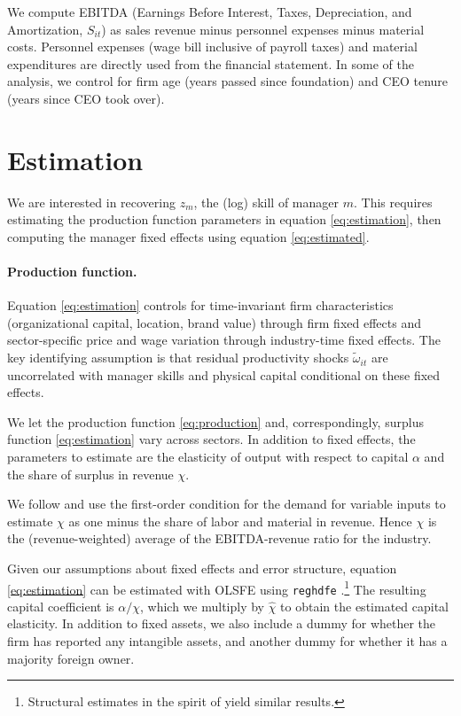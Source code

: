 \documentclass[11pt,a4paper]{article}
\begin{document}
We compute EBITDA (Earnings Before Interest, Taxes, Depreciation, and Amortization, $S_{it}$) as sales revenue minus personnel expenses minus material costs. Personnel expenses (wage bill inclusive of payroll taxes) and material expenditures are directly used from the financial statement. In some of the analysis, we control for firm age (years passed since foundation) and CEO tenure (years since CEO took over).

\section{Estimation}

We are interested in recovering $z_m$, the (log) skill of manager $m$. This requires estimating the production function parameters in equation \eqref{eq:estimation}, then computing the manager fixed effects using equation \eqref{eq:estimated}.

\paragraph{Production function.}
Equation \eqref{eq:estimation} controls for time-invariant firm characteristics (organizational capital, location, brand value) through firm fixed effects and sector-specific price and wage variation through industry-time fixed effects. The key identifying assumption is that residual productivity shocks $\tilde{\omega}_{it}$ are uncorrelated with manager skills and physical capital conditional on these fixed effects.

We let the production function \eqref{eq:production} and, correspondingly, surplus function \eqref{eq:estimation} vary across sectors. In addition to fixed effects, the parameters to estimate are the elasticity of output with respect to capital $\alpha$ and the share of surplus in revenue $\chi$. 

We follow \citet{Gandhi2020-nu} and use the first-order condition for the demand for variable inputs to estimate $\chi$ as one minus the share of labor and material in revenue. Hence $\chi$ is the (revenue-weighted) average of the EBITDA-revenue ratio for the industry.

Given our assumptions about fixed effects and error structure, equation \eqref{eq:estimation} can be estimated with OLSFE using \texttt{reghdfe} \citep{reghdfe}.\footnote{Structural estimates in the spirit of \citet{Olley1996-wy} yield similar results.} The resulting capital coefficient is $\alpha/\chi$, which we multiply by $\hat\chi$ to obtain the estimated capital elasticity. In addition to fixed assets, we also include a dummy for whether the firm has reported any intangible assets, and another dummy for whether it has a majority foreign owner.
\end{document}

